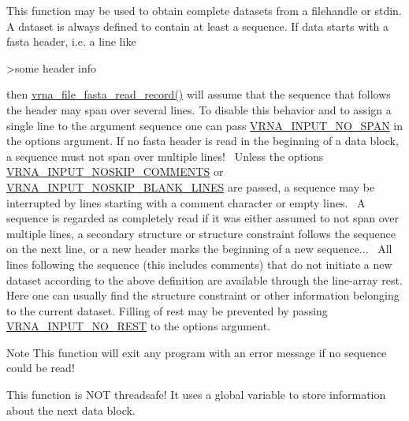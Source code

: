 This function may be used to obtain complete datasets from a filehandle or stdin. A dataset is always defined to contain at least a sequence. If data starts with a fasta header, i.\+e. a line like \begin{DoxyVerb}>some header info \end{DoxyVerb}
 then \mbox{\hyperlink{group__file__utils_ga8cfb7e271efc9e1f34640acb85475639}{vrna\+\_\+file\+\_\+fasta\+\_\+read\+\_\+record()}} will assume that the sequence that follows the header may span over several lines. To disable this behavior and to assign a single line to the argument \textquotesingle{}sequence\textquotesingle{} one can pass \mbox{\hyperlink{group__utils_ga0de536599b881c787b0943a2671da476}{V\+R\+N\+A\+\_\+\+I\+N\+P\+U\+T\+\_\+\+N\+O\+\_\+\+S\+P\+AN}} in the \textquotesingle{}options\textquotesingle{} argument. If no fasta header is read in the beginning of a data block, a sequence must not span over multiple lines!~\newline
 Unless the options \mbox{\hyperlink{group__utils_ga0f6311f11bed1842e3a527ab27b294c6}{V\+R\+N\+A\+\_\+\+I\+N\+P\+U\+T\+\_\+\+N\+O\+S\+K\+I\+P\+\_\+\+C\+O\+M\+M\+E\+N\+TS}} or \mbox{\hyperlink{group__utils_gab4db885222b3b69608310d7c7e63e286}{V\+R\+N\+A\+\_\+\+I\+N\+P\+U\+T\+\_\+\+N\+O\+S\+K\+I\+P\+\_\+\+B\+L\+A\+N\+K\+\_\+\+L\+I\+N\+ES}} are passed, a sequence may be interrupted by lines starting with a comment character or empty lines.~\newline
 A sequence is regarded as completely read if it was either assumed to not span over multiple lines, a secondary structure or structure constraint follows the sequence on the next line, or a new header marks the beginning of a new sequence...~\newline
 All lines following the sequence (this includes comments) that do not initiate a new dataset according to the above definition are available through the line-\/array \textquotesingle{}rest\textquotesingle{}. Here one can usually find the structure constraint or other information belonging to the current dataset. Filling of \textquotesingle{}rest\textquotesingle{} may be prevented by passing \mbox{\hyperlink{group__utils_ga7a2e8c50a0c7ce82e60da1016e1367fd}{V\+R\+N\+A\+\_\+\+I\+N\+P\+U\+T\+\_\+\+N\+O\+\_\+\+R\+E\+ST}} to the options argument.~\newline
 \begin{DoxyNote}{Note}
This function will exit any program with an error message if no sequence could be read! 

This function is N\+OT threadsafe! It uses a global variable to store information about the next data block.
\end{DoxyNote}
